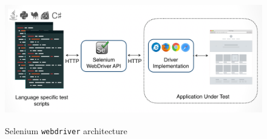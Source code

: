 \begin{figure}[h!]
\makeatletter 
\makeatother
    \centering
  \includegraphics[width=5.5in,height=2.2in]{./Figures/webdriver_Archi}
  \caption{Selenium \texttt{webdriver} architecture}
  \label{fig:webdriverArchitecture} 
\end{figure}

